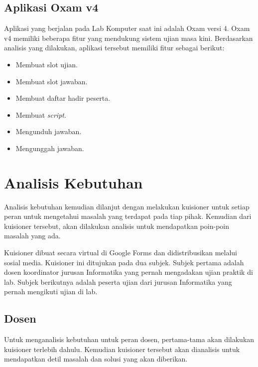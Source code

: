     \subsection{Aplikasi Oxam v4}
        Aplikasi yang berjalan pada Lab Komputer saat ini adalah Oxam versi 4.
        Oxam v4 memiliki beberapa fitur
        yang mendukung sistem ujian masa kini. Berdasarkan analisis yang
        dilakukan, aplikasi tersebut memiliki fitur sebagai berikut:
        
        \begin{itemize}
            \item Membuat slot ujian.
            \item Membuat slot jawaban.
            \item Membuat daftar hadir peserta.
            \item Membuat \textit{script}.
            \item Mengunduh jawaban.
            \item Mengunggah jawaban.
        \end{itemize}
    
\section{Analisis Kebutuhan}

    Analisis kebutuhan kemudian dilanjut dengan melakukan kuisioner untuk setiap
    peran untuk mengetahui masalah yang terdapat pada tiap pihak. Kemudian dari
    kuisioner tersebut, akan dilakukan analisis untuk mendapatkan poin-poin
    masalah yang ada.

    Kuisioner dibuat secara virtual di Google Forms dan didistribusikan melalui
    sosial media. Kuisioner ini ditujukan pada dua subjek. Subjek pertama adalah
    dosen koordinator jurusan Informatika yang pernah mengadakan ujian praktik
    di lab. Subjek berikutnya adalah peserta ujian dari jurusan Informatika yang
    pernah mengikuti ujian di lab. 
    
\subsection{Dosen}
    Untuk menganalisis kebutuhan untuk peran dosen, pertama-tama akan dilakukan
    kuisioner terlebih dahulu. Kemudian kuisioner tersebut akan dianalisis untuk
    mendapatkan detil masalah dan solusi yang akan diberikan.

